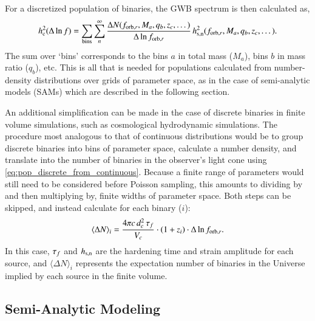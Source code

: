 \documentclass[useAMS, usenatbib]{mnras}
\begin{document}
        For a discretized population of binaries, the GWB spectrum is then calculated as,
        \begin{equation}
            \label{eq:gwb_discrete}
            h_{\textrm{c}}^2(\Delta \ln f) = \sum_\textrm{bins} \sum_n^\infty \frac{\Delta N(f_{\textrm{orb},r},M_a,q_b,z_c,\dots)}{\Delta \ln f_{\textrm{orb},r}} \, h_{\textrm{s,n}}^2(f_{\textrm{orb},r},M_a,q_b,z_c,\dots).
        \end{equation}
        The sum over `bins' corresponds to the bins $a$ in total mass ($M_a$), bins $b$ in mass ratio ($q_b$), etc.
        This is all that is needed for populations calculated from number-density distributions over grids of parameter space, as in the case of semi-analytic models (SAMs) which are described in the following section.

        An additional simplification can be made in the case of discrete binaries in finite volume simulations, such as cosmological hydrodynamic simulations.  The procedure most analogous to that of continuous distributions would be to group discrete binaries into bins of parameter space, calculate a number density, and translate into the number of binaries in the observer's light cone using \eqref{eq:pop_discrete_from_continuous}.  Because a finite range of parameters would still need to be considered before Poisson sampling, this amounts to dividing by and then multiplying by, finite widths of parameter space.  Both steps can be skipped, and instead calculate for each binary ($i$):
        \begin{equation}
            \label{eq:expectation_number_of_single_binary}
            \langle \Delta N \rangle_i = \frac{4\pi c \, d_c^2 \, \tau_f}{V_c} \cdot (1+z_i) \cdot \Delta \ln f_{\textrm{orb},r}.
        \end{equation}
        In this case, $\tau_f$ and $h_{\textrm{s,n}}$ are the hardening time and strain amplitude for each source, and $\langle \Delta N \rangle_i$ represents the expectation number of binaries in the Universe implied by each source in the finite volume.


    \subsection{Semi-Analytic Modeling}
\end{document}
